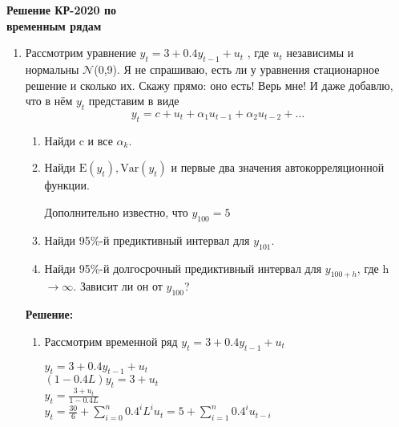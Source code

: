 \documentclass[a4paper,14pt]{article}
\begin{document}
\fontsize{12pt}{14pt}\selectfont

\begin{center}
	
	\fontsize{18pt}{16pt}\selectfont
	
	\textbf{Решение КР-2020 по} \\
	
	\textbf{временным рядам}
	
\end{center}

\vspace{0.5cm}

\begin{enumerate}

\item Рассмотрим уравнение $y_t = 3 + 0.4y_{t−1} + u_t$ , где $u_t$ независимы и нормальны $\mathcal{N}$(0,9). Я не спрашиваю, есть ли у уравнения стационарное решение и сколько их. Скажу прямо: оно есть! Верь мне! И даже добавлю, что в нём $y_t$ представим в виде 
$$ y_t =c+u_t +\alpha_1u_{t−1} +\alpha_2u_{t−2} +\dots$$
\begin{enumerate}
    \item Найди c и все $\alpha_k$.
    \item Найди $\text{E}(y_t), \text{Var}(y_t)$ и первые два значения автокорреляционной функции.
    
    Дополнительно известно, что $y_{100} = 5$
    \item Найди 95\%-й предиктивный интервал для $y_{101}$.
    \item Найди 95\%-й долгосрочный предиктивный интервал для $y_{100+h}$, где h $\rightarrow \infty$. Зависит ли он от $y_{100}$?
\end{enumerate}
\textbf{Решение:}
\begin{enumerate}
	\item Рассмотрим временной ряд  $y_t = 3 + 0.4y_{t-1} + u_t$
\begin{center}
	
	\begin{spacing}{1.5}
		
	$y_t = 3 + 0.4y_{t-1} + u_t$ \\
	
	$(1-0.4L)y_t = 3 + u_t$ \\
	
	$y_t = \frac{3+u_t}{1-0.4L}$\\
	
	$y_t = \frac{30}{6} + \sum_{i=0}^n 0.4^{i}L^{i}u_t = 5 + \sum_{i=1}^n 0.4^iu_{t-i}$


\end{spacing}
\end{center}
\end{enumerate}
\end{enumerate}
\end{document}
